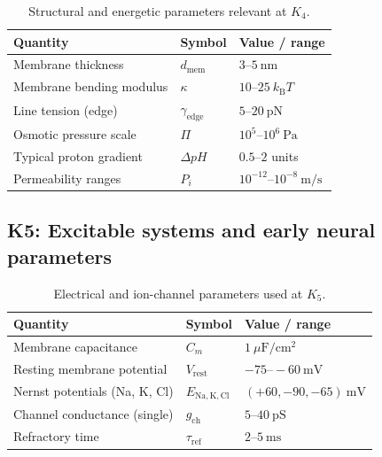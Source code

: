 \begin{table}[htbp]
  \centering
  \caption{Structural and energetic parameters relevant at \(K_4\).}
  \label{tab:k4-membrane-parameters}
  \begin{tabular}{@{}L{0.44\textwidth}L{0.16\textwidth}L{0.23\textwidth}@{}}
    \hline
    Quantity & Symbol & Value / range \\
    \hline
    Membrane thickness & \(d_\mathrm{mem}\)
        & \(3\text{–}5~\mathrm{nm}\) \\
    Membrane bending modulus & \(\kappa\)
        & \(10\text{–}25~k_\mathrm{B}T\) \\
    Line tension (edge) & \(\gamma_\mathrm{edge}\)
        & \(5\text{–}20~\mathrm{pN}\) \\
    Osmotic pressure scale & \(\Pi\)
        & \(10^5\text{–}10^6~\mathrm{Pa}\) \\
    Typical proton gradient & \(\Delta pH\)
        & \(0.5\text{–}2\) units \\
    Permeability ranges & \(P_i\)
        & \(10^{-12}\text{–}10^{-8}~\mathrm{m/s}\) \\
    \hline
  \end{tabular}
\end{table}


\subsection*{K5: Excitable systems and early neural parameters}

\begin{table}[htbp]
  \centering
  \caption{Electrical and ion-channel parameters used at \(K_5\).}
  \label{tab:k5-excitable-parameters}
  \begin{tabular}{@{}L{0.44\textwidth}L{0.16\textwidth}L{0.23\textwidth}@{}}
    \hline
    Quantity & Symbol & Value / range \\
    \hline
    Membrane capacitance & \(C_m\)
        & \(1~\mu\mathrm{F/cm^2}\) \\
    Resting membrane potential & \(V_\mathrm{rest}\)
        & \(-75\text{–}-60~\mathrm{mV}\) \\
    Nernst potentials (Na, K, Cl) &
        \(E_{\mathrm{Na,K,Cl}}\)
        & \((+60, -90, -65)~\mathrm{mV}\) \\
    Channel conductance (single) & \(g_\mathrm{ch}\)
        & \(5\text{–}40~\mathrm{pS}\) \\
    Refractory time & \(\tau_\mathrm{ref}\)
        & \(2\text{–}5~\mathrm{ms}\) \\
    \hline
  \end{tabular}
\end{table}

